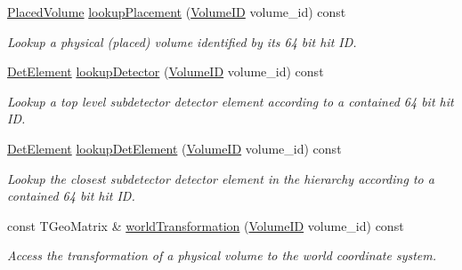 \begin{DoxyCompactItemize}
\hyperlink{class_d_d4hep_1_1_geometry_1_1_placed_volume}{PlacedVolume} \hyperlink{class_d_d4hep_1_1_geometry_1_1_volume_manager_a1b1dc5fd02dcae196511200f32c9e309}{lookupPlacement} (\hyperlink{class_d_d4hep_1_1_geometry_1_1_volume_manager_ab1f746b561c93be38bc7c6e66fc8ca8a}{VolumeID} volume\_\-id) const 
\begin{DoxyCompactList}\small\item\em Lookup a physical (placed) volume identified by its 64 bit hit ID. \item\end{DoxyCompactList}\item 
\hyperlink{class_d_d4hep_1_1_geometry_1_1_det_element}{DetElement} \hyperlink{class_d_d4hep_1_1_geometry_1_1_volume_manager_a3734beabd6ff537a641b80e79e84b93b}{lookupDetector} (\hyperlink{class_d_d4hep_1_1_geometry_1_1_volume_manager_ab1f746b561c93be38bc7c6e66fc8ca8a}{VolumeID} volume\_\-id) const 
\begin{DoxyCompactList}\small\item\em Lookup a top level subdetector detector element according to a contained 64 bit hit ID. \item\end{DoxyCompactList}\item 
\hyperlink{class_d_d4hep_1_1_geometry_1_1_det_element}{DetElement} \hyperlink{class_d_d4hep_1_1_geometry_1_1_volume_manager_a47c43ad4eda1df62d538e2adde993b78}{lookupDetElement} (\hyperlink{class_d_d4hep_1_1_geometry_1_1_volume_manager_ab1f746b561c93be38bc7c6e66fc8ca8a}{VolumeID} volume\_\-id) const 
\begin{DoxyCompactList}\small\item\em Lookup the closest subdetector detector element in the hierarchy according to a contained 64 bit hit ID. \item\end{DoxyCompactList}\item 
const TGeoMatrix \& \hyperlink{class_d_d4hep_1_1_geometry_1_1_volume_manager_a2e00b14d61e22f8da9dc00640840b4c8}{worldTransformation} (\hyperlink{class_d_d4hep_1_1_geometry_1_1_volume_manager_ab1f746b561c93be38bc7c6e66fc8ca8a}{VolumeID} volume\_\-id) const 
\begin{DoxyCompactList}\small\item\em Access the transformation of a physical volume to the world coordinate system. \item\end{DoxyCompactList}\end{DoxyCompactItemize}
